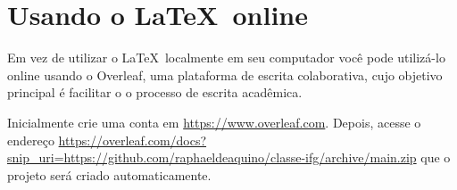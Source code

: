 \section{Usando o \LaTeX\ online}

Em vez de utilizar o \LaTeX\ localmente em seu computador você pode utilizá-lo online usando o Overleaf, uma plataforma de escrita colaborativa, cujo objetivo principal  é facilitar o o processo de escrita acadêmica.

Inicialmente crie uma conta em \url{https://www.overleaf.com}. Depois, acesse o endereço \url{https://overleaf.com/docs?snip_uri=https://github.com/raphaeldeaquino/classe-ifg/archive/main.zip} que o projeto será criado automaticamente.